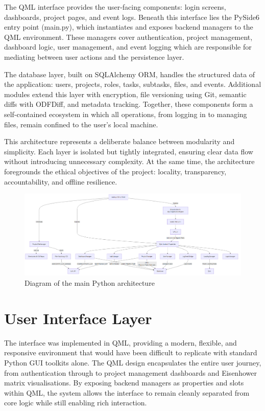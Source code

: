 \documentclass{report}
\begin{document}
The QML interface provides the user-facing components: login screens, dashboards, project pages, and event logs. 
Beneath this interface lies the PySide6 entry point (main.py), which instantiates and exposes backend managers to the QML environment. 
These managers cover authentication, project management, dashboard logic, user management, and event logging which are responsible for mediating between user actions and the persistence layer.

The database layer, built on SQLAlchemy ORM, handles the structured data of the application: users, projects, roles, tasks, subtasks, files, and events. 
Additional modules extend this layer with encryption, file versioning using Git, semantic diffs with ODFDiff, and metadata tracking. 
Together, these components form a self-contained ecosystem in which all operations, from logging in to managing files, remain confined to the user's local machine.

This architecture represents a deliberate balance between modularity and simplicity. 
Each layer is isolated but tightly integrated, ensuring clear data flow without introducing unnecessary complexity. 
At the same time, the architecture foregrounds the ethical objectives of the project: locality, transparency, accountability, and offline resilience.

\begin{figure}[h!]
  \centering
  \includegraphics[width=\linewidth,height=\textheight,keepaspectratio]{png_files/main_py_architecture.png}
  \caption{Diagram of the main Python architecture}
    \label{fig:Main Python Architecture}
\end{figure}

\section{User Interface Layer}

The interface was implemented in QML, providing a modern, flexible, and responsive environment that would have been difficult to replicate with standard Python GUI toolkits alone. 
The QML design encapsulates the entire user journey, from authentication through to project management dashboards and Eisenhower matrix visualisations. 
By exposing backend managers as properties and slots within QML, the system allows the interface to remain cleanly separated from core logic while still enabling rich interaction.
\end{document}
